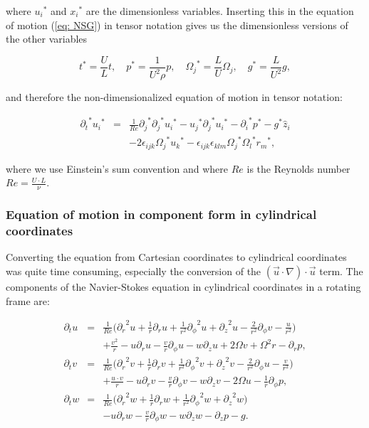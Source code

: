 \documentclass[12pt, a4paper]{article} %
\begin{document}
			
			where ${u_i}^*$ and ${x_i}^*$ are the dimensionless variables. Inserting this in  the equation of motion (\ref{eq: NSG}) in tensor notation gives us the dimensionless versions of the other variables
			\pagebreak
			
			\begin{equation}
			t^* = \frac{U}{L} t , \quad p^* = \frac{1}{U^2\rho} p , \quad {\Omega_j}^* = \frac{L}{U} \Omega_j , \quad g^* = \frac{L}{U^2} g ,
			\nonumber
			\end{equation}
			
			and therefore the non-dimensionalized equation of motion in tensor notation:
			
			\begin{eqnarray}
			{\partial_t}^*{u_i}^* &=& \frac{1}{Re}{\partial_j}^*{\partial_j}^*{u_i}^* - {u_j}^*{\partial_j}^*{u_i}^* -{\partial_i}^*p^* - g^*\hat{z}_i 
			\nonumber \\
			&&- 2\epsilon_{ijk}{\Omega_j}^*{u_k}^* - \epsilon_{ijk}\epsilon_{klm}{\Omega_j}^*{\Omega_l}^*{r_m}^* ,
			\label{eq:NonDim NSG}
			\end{eqnarray}
			
			where we use Einstein's sum convention and where $Re$ is the Reynolds number $Re = \frac{U\cdot L}{\nu}$.
		
		\subsubsection{Equation of motion in component form in cylindrical coordinates}
			Converting the equation from Cartesian coordinates to cylindrical coordinates was quite time consuming, especially the conversion of the $(\vec{u} \cdot \nabla)\cdot\vec{u}$ term.
			The components of the Navier-Stokes equation in cylindrical coordinates in a rotating frame are:
			
			\begin{eqnarray}
				\partial_t u &=& \frac{1}{Re} \Big({\partial_r}^2 u + \frac{1}{r} \partial_r u + \frac{1}{r^2} {\partial_\phi}^2 u + {\partial_z}^2 u - \frac{2}{r^2} \partial_\phi v - \frac{u}{r^2} \Big) \nonumber \\
				&& + \frac{v^2}{r} - u \partial_r u - \frac{v}{r} \partial_\phi u - w \partial_z u + 2\Omega v + \Omega^2 r - \partial_r p , 
				\label{eq:NSG cyl u}
				\\
				\partial_t v &=& \frac{1}{Re} \Big({\partial_r}^2 v + \frac{1}{r} \partial_r v + \frac{1}{r^2} 
				{\partial_\phi}^2 v + {\partial_z}^2 v - \frac{2}{r^2} \partial_\phi u - \frac{v}{r^2} \Big) \nonumber \\
				&& + \frac{u\cdot v}{r} - u \partial_r v - \frac{v}{r} \partial_\phi v - w \partial_z v - 2\Omega u - \frac{1}{r}\partial_\phi p ,
				\label{eq:NSG cyl v}
				\\
				\partial_t w &=& \frac{1}{Re} \Big({\partial_r}^2 w + \frac{1}{r} \partial_r w + \frac{1}{r^2} {\partial_\phi}^2 w + {\partial_z}^2 w \Big) \nonumber \\
				&& - u \partial_r w - \frac{v}{r} \partial_\phi w - w \partial_z w - \partial_z p - g .
				\label{eq:NSG cyl w}
			\end{eqnarray}
		
\end{document}
